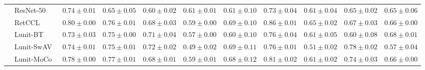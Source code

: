 \begin{tabular}{ll|cccc|c|cccc}
 & ResNet-50~\cite{he2015deep} & $0.74 \pm 0.01$ & $0.65 \pm 0.05$ & $0.60 \pm 0.02$ & $0.61 \pm 0.01$ & $0.61 \pm 0.10$ & $0.73 \pm 0.04$ & $0.61 \pm 0.04$ & $0.65 \pm 0.02$ & $0.65 \pm 0.06$ \\
 & RetCCL~\cite{wang2023retccl} & $0.80 \pm 0.00$ & $0.76 \pm 0.01$ & $0.68 \pm 0.03$ & $0.59 \pm 0.00$ & $0.69 \pm 0.10$ & $0.86 \pm 0.01$ & $0.65 \pm 0.02$ & $0.67 \pm 0.03$ & $0.66 \pm 0.00$ \\
 & Lunit-BT~\cite{kang2023benchmarking} & $0.73 \pm 0.03$ & $0.75 \pm 0.00$ & $0.71 \pm 0.04$ & $0.57 \pm 0.00$ & $0.60 \pm 0.10$ & $0.76 \pm 0.04$ & $0.61 \pm 0.05$ & $0.60 \pm 0.08$ & $0.68 \pm 0.01$ \\
 & Lunit-SwAV~\cite{kang2023benchmarking} & $0.74 \pm 0.01$ & $0.75 \pm 0.01$ & $\mathbf{0.72 \pm 0.02}$ & $0.49 \pm 0.02$ & $0.69 \pm 0.11$ & $0.76 \pm 0.01$ & $0.51 \pm 0.02$ & $\mathbf{0.78 \pm 0.02}$ & $0.57 \pm 0.04$ \\
 & Lunit-MoCo~\cite{kang2023benchmarking} & $0.78 \pm 0.00$ & $\mathbf{0.77 \pm 0.01}$ & $0.68 \pm 0.01$ & $0.59 \pm 0.01$ & $0.68 \pm 0.12$ & $0.81 \pm 0.02$ & $0.61 \pm 0.02$ & $0.74 \pm 0.03$ & $0.66 \pm 0.00$ \\
\cline{1-11}
\bottomrule
\end{tabular}
